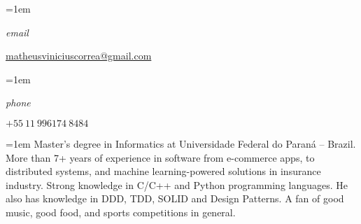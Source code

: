 \documentclass[fontsize=11pt,paper=a4]{scrartcl}
\date{} %
\newcommand{\ProfileInfo}[2]{\noindent\hangindent=1em\hangafter=0%
  \parbox{5em}{\small \textit{#1}\hspace{1em}} {\small #2}}
\newcommand{\Description}[1]{\hangindent=1em\hangafter=0%
  \noindent\RaggedRight\footnotesize{#1}\par\normalsize\vspace{.5em}}
\begin{document}
\pagestyle{scrheadings}


\begin{cv}{%
    \noindent%
  } %
  
  \noindent{%
  }
  
  \vspace{.5em}
  
  \ProfileInfo{email}{\href{mailto:matheusviniciuscorrea@gmail.com}{matheusviniciuscorrea@gmail.com}}


  \ProfileInfo{phone}{\(+55\ 11\ 996174\ 8484\)}
  
  \vspace{1em}

  \noindent{}\vspace{.5em}
  
  \Description{%
    Master's degree in Informatics at Universidade Federal do Paraná --
    Brazil. More than 7+ years of experience in software from e-commerce
    apps, to distributed systems, and machine learning-powered solutions in
    insurance industry. Strong knowledge in C/C++ and Python programming
    languages. He also has knowledge in DDD, TDD, SOLID and Design Patterns.
    A fan of good music, good food, and sports
    competitions in general.%
  }


\end{cv}
\end{document}
